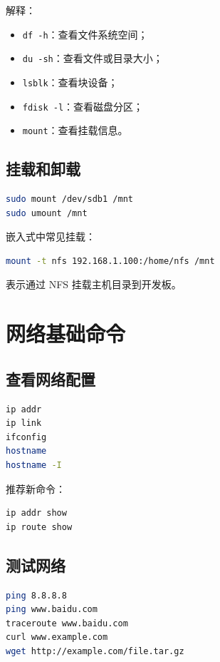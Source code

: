 \documentclass[UTF8,a4paper,12pt]{ctexart}
\begin{document}
解释：
\begin{itemize}
    \item \texttt{df -h}：查看文件系统空间；
    \item \texttt{du -sh}：查看文件或目录大小；
    \item \texttt{lsblk}：查看块设备；
    \item \texttt{fdisk -l}：查看磁盘分区；
    \item \texttt{mount}：查看挂载信息。
\end{itemize}

\subsection{挂载和卸载}

\begin{lstlisting}[language=bash]
sudo mount /dev/sdb1 /mnt
sudo umount /mnt
\end{lstlisting}

嵌入式中常见挂载：

\begin{lstlisting}[language=bash]
mount -t nfs 192.168.1.100:/home/nfs /mnt
\end{lstlisting}

表示通过 NFS 挂载主机目录到开发板。

\section{网络基础命令}

\subsection{查看网络配置}

\begin{lstlisting}[language=bash]
ip addr
ip link
ifconfig
hostname
hostname -I
\end{lstlisting}

推荐新命令：

\begin{lstlisting}[language=bash]
ip addr show
ip route show
\end{lstlisting}

\subsection{测试网络}

\begin{lstlisting}[language=bash]
ping 8.8.8.8
ping www.baidu.com
traceroute www.baidu.com
curl www.example.com
wget http://example.com/file.tar.gz
\end{lstlisting}
\end{document}
